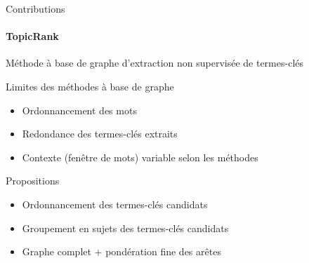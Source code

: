 \begin{frame}{Contributions}\framesubtitle{TopicRank}
  Méthode à base de graphe d'extraction non supervisée de termes-clés

  \vspace{1em}

  \begin{alertblock}{Limites des méthodes à base de graphe}
    \begin{itemize}
      \item{Ordonnancement des mots}
      \item{Redondance des termes-clés extraits}
      \item{Contexte (fenêtre de mots) variable selon les méthodes}
    \end{itemize}
  \end{alertblock}

  \vspace{1em}

  \begin{block}{Propositions}
    \begin{itemize}
      \item{Ordonnancement des termes-clés candidats}
      \item{Groupement en sujets des termes-clés candidats}
      \item{Graphe complet $+$ pondération fine des arêtes}
    \end{itemize}
  \end{block}
\end{frame}



